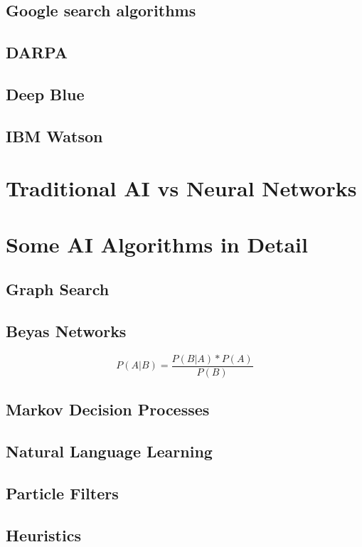 \documentclass[DIV=calc, paper=a4, fontsize=11pt, twocolumn]{scrreprt}	 %
\begin{document}
        \subsection{Google search algorithms}
        \subsection{DARPA}
        \subsection{Deep Blue}
        \subsection{IBM Watson}

        \section{Traditional AI vs Neural Networks}

        \newpage
        \section{Some AI Algorithms in Detail}
        \subsection{Graph Search}
        \subsection{Beyas Networks}

        \[P(A|B)=\frac{P(B|A) * P(A)}{P(B)}\]

        \subsection{Markov Decision Processes}
        \subsection{Natural Language Learning}
        \subsection{Particle Filters}
        \subsection{Heuristics}
\end{document}
